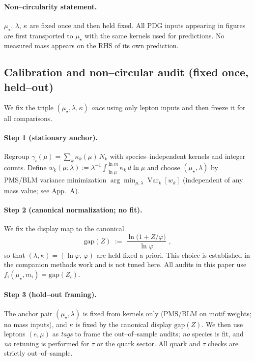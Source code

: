 \documentclass[epjc3]{svjour3}
\begin{document}
\paragraph{Non–circularity statement.}
$\mu_\star$, $\lambda$, $\kappa$ are fixed once and then held fixed. All PDG inputs appearing in figures are first transported to $\mu_\star$ with the same kernels used for predictions. No measured mass appears on the RHS of its own prediction.

\subsection{Calibration and non–circular audit (fixed once, held–out)}
We fix the triple $(\mu_\star,\lambda,\kappa)$ \emph{once} using only lepton inputs and then freeze it for all comparisons.

\paragraph{Step 1 (stationary anchor).} Regroup $\gamma_i(\mu)=\sum_k \kappa_k(\mu)\,N_k$ with species–independent kernels and integer counts. Define $w_k(\mu;\lambda):=\lambda^{-1}\!\int_{\ln\mu}^{\ln m}\kappa_k\,d\ln\mu$ and choose $(\mu_\star,\lambda)$ by PMS/BLM variance minimization $\arg\min_{\mu,\lambda}\operatorname{Var}_k[w_k]$ (independent of any mass value; see App.~A).

\paragraph{Step 2 (canonical normalization; no fit).} We fix the display map to the canonical
\[
\mathrm{gap}(Z)\;:=\;\frac{\ln\!\bigl(1+Z/\varphi\bigr)}{\ln\varphi}\,\,,
\]
so that $(\lambda,\kappa)=(\ln\varphi,\,\varphi)$ are held fixed a priori. This choice is established in the companion methods work and is not tuned here. All audits in this paper use $f_i(\mu_\star,m_i)=\mathrm{gap}(Z_i)$.

\paragraph{Step 3 (hold–out framing).} The anchor pair $(\mu_\star,\lambda)$ is fixed from kernels only (PMS/BLM on motif weights; no mass inputs), and $\kappa$ is fixed by the canonical display $\mathrm{gap}(Z)$. We then use leptons $(e,\mu)$ as \emph{tags} to frame the out–of–sample audits; \emph{no} species is fit, and \emph{no} retuning is performed for $\tau$ or the quark sector. All quark and $\tau$ checks are strictly out–of–sample.
\end{document}
